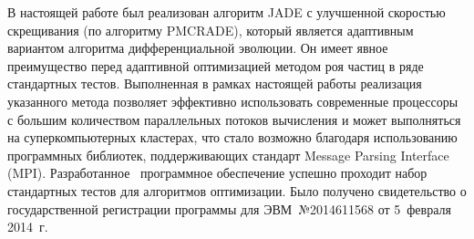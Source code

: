
В настоящей работе был реализован алгоритм JADE с улучшенной
скоростью скрещивания (по алгоритму PMCRADE), который является
адаптивным вариантом алгоритма дифференциальной эволюции. Он имеет
явное преимущество перед адаптивной оптимизацией методом роя частиц в
ряде стандартных тестов.  Выполненная в рамках настоящей работы
реализация указанного метода позволяет эффективно использовать
современные процессоры с большим количеством параллельных потоков
вычисления и может выполняться на суперкомпьютерных кластерах, что
стало возможно благодаря использованию программных библиотек,
поддерживающих стандарт Message Parsing Interface (MPI).
Разработанное~\cite{JADE-web} программное обеспечение успешно проходит
набор стандартных тестов для алгоритмов оптимизации.  Было получено
свидетельство о государственной регистрации программы для
ЭВМ~№2014611568 от 5~февраля 2014~г.


